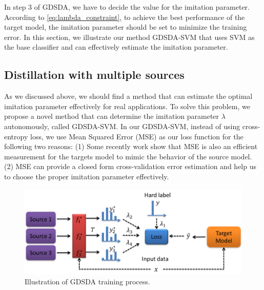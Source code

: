 In step 3 of GDSDA, we have to decide the value for the imitation parameter. According to \eqref{eq:lambda_constraint}, to achieve the best performance of the target model, the imitation parameter should be set to minimize the training error. In this section, we illustrate our method GDSDA-SVM that uses SVM as the base classifier and can effectively estimate the imitation parameter.
\subsection{Distillation with multiple sources}
As we discussed above, we should find a method that can estimate the optimal imitation parameter effectively for real applications. 
To solve this problem, we propose a novel method that can determine the imitation parameter $\lambda$ autonomously, called GDSDA-SVM. In our GDSDA-SVM, instead of using cross-entropy loss, we use Mean Squared Error (MSE) as our loss function for the following two reasons: (1) Some recently work \cite{ba2014deep,luo2016face,romero2014fitnets,urban2016deep} show that MSE is also an efficient measurement for the targets model to mimic the behavior of the source model. (2) MSE can provide a closed form cross-validation error estimation and help us to choose the proper imitation parameter effectively. 

\begin{figure}
\centering
\includegraphics[scale=.4]{figure/multi-GDDA.png}
\caption{Illustration of GDSDA training process.}
\end{figure}

